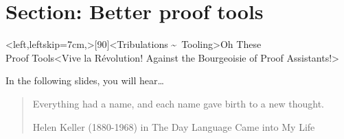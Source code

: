 \hypertarget{section-better-proof-tools}{%
\section{Section: Better proof tools}\label{section-better-proof-tools}}

\interlude*<left,leftskip=7cm,>[90]<Tribulations \textasciitilde\ Tooling>{Oh These\\Proof Tools}<Vive la Révolution! Against the Bourgeoisie of Proof Assistants!>

\begin{frame}{In the following slides, you will hear…}



  \blockquote[Helen Keller (1880-1968) in The Day Language Came into My Life]{
    Everything had a name, and each name gave birth to a new thought.
  }





% 






\end{frame}



